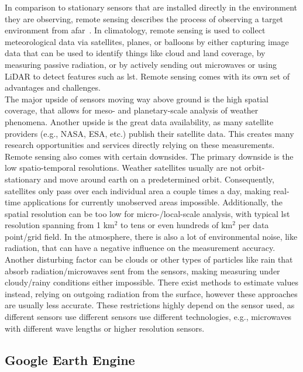 In comparison to stationary sensors that are installed directly in the environment they are observing, remote sensing describes the process of observing a target environment from afar~\cite{campbell2011introduction}. In climatology, remote sensing is used to collect meteorological data via satellites, planes, or balloons by either capturing image data that can be used to identify things like cloud and land coverage, by measuring passive radiation, or by actively sending out microwaves or using LiDAR to detect features such as \gls{lst}. Remote sensing comes with its own set of advantages and challenges.\\
The major upside of sensors moving way above ground is the high spatial coverage, that allows for meso- and planetary-scale analysis of weather phenomena. Another upside is the great data availability, as many satellite providers (e.g., NASA, ESA, etc.) publish their satellite data. This creates many research opportunities and services directly relying on these measurements.\\
Remote sensing also comes with certain downsides. The primary downside is the low spatio-temporal resolutions. Weather satellites usually are not orbit-stationary and move around earth on a predetermined orbit. Consequently, satellites only pass over each individual area a couple times a day, making real-time applications for currently unobserved areas impossible. Additionally, the spatial resolution can be too low for micro-/local-scale analysis, with typical \gls{lst} resolution spanning from 1 km$^{2}$ to tens or even hundreds of km$^{2}$ per data point/grid field. In the atmosphere, there is also a lot of environmental noise, like radiation, that can have a negative influence on the measurement accuracy. Another disturbing factor can be clouds or other types of particles like rain that absorb radiation/microwaves sent from the sensors, making measuring under cloudy/rainy conditions either impossible. There exist methods to estimate values instead, relying on outgoing radiation from the surface, however these approaches are usually less accurate. These restrictions highly depend on the sensor used, as different sensors use different sensors use different technologies, e.g., microwaves with different wave lengths or higher resolution sensors.

\subsection{Google Earth Engine}


